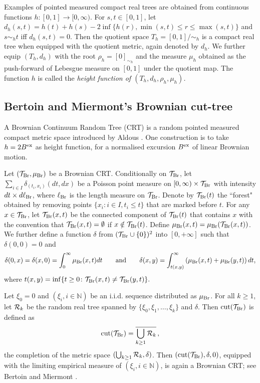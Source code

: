 \documentclass[11pt,a4paper]{article}
\newcommand{\bN}{\mathbb{N}}
\newcommand{\cT}{\mathcal{T}}
\begin{document}
Examples of pointed measured compact real trees are obtained from continuous functions $h\colon[0,1]\rightarrow[0,\infty)$. For $s,t\in[0,1]$, let 
$d_h(s,t)=h(t)+h(s)-2\inf\{h(r),\min(s,t)\!\le\! r\!\le\!\max(s,t)\}$ and $s\sim_h t$ iff $d_h(s,t)=0$. Then the quotient space $T_h=[0,1]/\sim_h$ is a compact real tree when equipped 
with the quotient metric, again denoted by $d_h$. We further equip $(T_h,d_h)$ with the root $\rho_h=[0]_{\sim_h}$ and the measure $\mu_h$ obtained as the  
push-forward of Lebesgue measure on $[0,1]$ under the quotient map. The function $h$ is called the \em height function \em of $(T_h,d_h,\rho_h,\mu_h)$. 


\subsection{Bertoin and Miermont's Brownian cut-tree}\label{secbrcut}

A Brownian Continuum Random Tree (CRT) is a random pointed measured compact metric space introduced by Aldous \cite{Ald91}. One construction is to take $h=2B^{\rm ex}$ 
as height function, for a normalised excursion $B^{\rm ex}$ of linear Brownian motion. 

Let $({\cal T}_{\rm Br},\mu_{\rm Br})$ be a Brownian CRT. Conditionally on ${\cal T}_{\rm Br}$, let $\sum_{i\in I}\delta_{(t_i, x_i)}(dt, dx)$ be a Poisson point measure on $[0, \infty)\times {\cal T}_{\rm Br}$ with intensity $dt\times d{\ell}_{\rm Br}$, where $\ell_{\rm Br}$ is the length measure on ${\cal T}_{\rm Br}$. Denote by ${\cal T}_{\rm Br}(t)$ the ``forest" obtained by removing points $\{x_i\colon i\in I, t_i\leq t\}$ that are marked before $t$. For any $x\in {\cal T}_{\rm Br}$,  let ${\cal T}_{\rm Br}(x, t)$ be the connected component of ${\cal T}_{\rm Br}(t)$ that contains $x$ with the convention that ${\cal T}_{\rm Br}(x, t)=\emptyset$ if $x\notin {\cal T}_{\rm Br}(t)$. Define ${\mu}_{\rm Br}(x, t)=\mu_{\rm Br}({\cal T}_{\rm Br}(x, t) )$.  We further define a function $\delta $ from $({\cal T}_{\rm Br}\cup \{0\})^2$ into $[0, +\infty]$ such that $\delta(0,0)=0$ and 
$$\delta(0, x)=\delta(x, 0)=\int_0^{\infty} {\mu}_{\rm Br}(x, t) dt\qquad\mbox{and}\qquad
\delta(x, y)=\int_{t(x, y)}^{\infty}\left( {\mu}_{\rm Br}(x, t)+{\mu}_{\rm Br}(y, t)\right)dt,$$
where $t(x, y)=\inf\{t\geq0\colon {\cal T}_{\rm Br}(x, t)\neq{\cal T}_{\rm Br}(y, t)\}.$


Let $\xi_0=0$ and $(\xi_i, i\in \bN)$ be an i.i.d. sequence distributed as $\mu_{\rm Br}$. For all $k\ge 1$, let ${\cal R}_k$ be the random real tree spanned by $\{\xi_0, \xi_1,\ldots, \xi_k\}$ and $\delta$.  Then $\text{cut}({\cal T}_{\rm Br})$ is defined as 
$$
\text{cut}({\cal T}_{\rm Br})=\overline{\bigcup_{k\geq 1}{\cal R}_k}\,,
$$
the completion of the metric space $(\bigcup_{k\geq1}{\cal R}_k, \delta)$. Then $({\rm cut}(\cT_{\rm Br}),\delta,0)$, equipped 
with the limiting empirical measure of $(\xi_i,i\in\bN)$, is again a Brownian CRT; see Bertoin and Miermont \cite{BM}.
\end{document}
